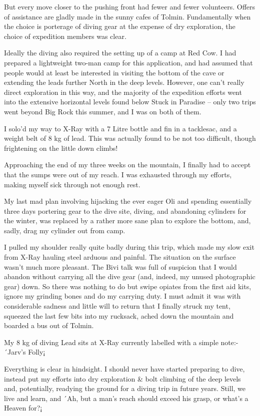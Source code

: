 But every move closer to the pushing front had fewer and fewer
volunteers. Offers of assistance are gladly made in the sunny cafes of
Tolmin. Fundamentally when the choice is porterage of diving gear at the
expense of dry exploration, the choice of expedition members was clear.

Ideally the diving also required the setting up of a camp at Red Cow. I
had prepared a lightweight two-man camp for this application, and had
assumed that people would at least be interested in visiting the bottom
of the cave or extending the leads further North in the deep levels.
However, one can't really direct exploration in this way, and the
majority of the expedition efforts went into the extensive horizontal
levels found below Stuck in Paradise -- only two trips went beyond Big
Rock this summer, and I was on both of them.

I solo'd my way to X-Ray with a 7 Litre bottle and fin in a tacklesac,
and a weight belt of 8 kg of lead. This was actually found to be not too
difficult, though frightening on the little down climbs!

Approaching the end of my three weeks on the mountain, I finally had to
accept that the sumps were out of my reach. I was exhausted through my
efforts, making myself sick through not enough rest.

My last mad plan involving hijacking the ever eager Oli and spending
essentially three days portering gear to the dive site, diving, and
abandoning cylinders for the winter, was replaced by a rather more sane
plan to explore the bottom, and, sadly, drag my cylinder out from camp.

I pulled my shoulder really quite badly during this trip, which made my
slow exit from X-Ray hauling steel arduous and painful. The situation on
the surface wasn't much more pleasant. The Bivi talk was full of
suspicion that I would abandon without carrying all the dive gear (and,
indeed, my unused photographic gear) down. So there was nothing to do
but swipe opiates from the first aid kits, ignore my grinding bones and
do my carrying duty. I must admit it was with considerable sadness and
little will to return that I finally struck my tent, squeezed the last
few bits into my rucksack, ached down the mountain and boarded a bus out
of Tolmin.

My 8 kg of diving Lead sits at X-Ray currently labelled with a simple
note:- ´Jarv's Folly¡

Everything is clear in hindsight. I should never have started preparing
to dive, instead put my efforts into dry exploration \& bolt climbing of
the deep levels and, potentially, readying the ground for a diving trip
in future years. Still, we live and learn, and ´Ah, but a man's reach
should exceed his grasp, or what's a Heaven for?¡


